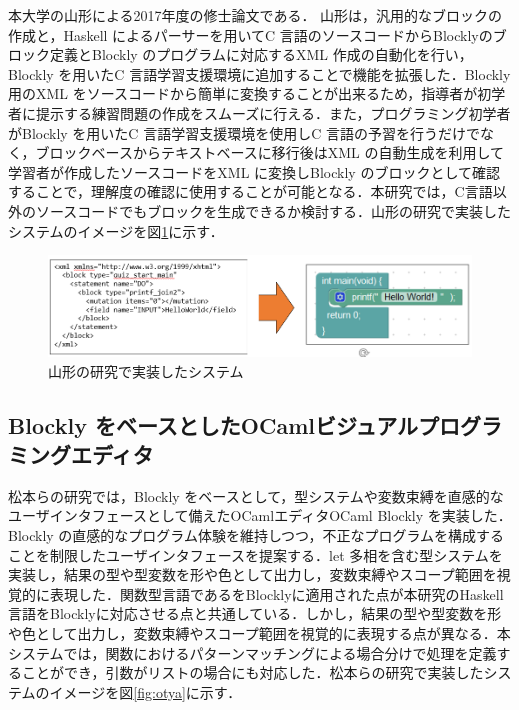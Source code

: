 \documentclass{risepaper}
\begin{document}
  本大学の山形による2017年度の修士論文\cite{yamagata, yamagata2}である．
 山形は，汎用的なブロックの作成と，Haskell によるパーサーを用いてC 言語のソースコードからBlocklyのブロック定義とBlockly のプログラムに対応するXML 作成の自動化を行い，Blockly を用いたC 言語学習支援環境に追加することで機能を拡張した．Blockly 用のXML をソースコードから簡単に変換することが出来るため，指導者が初学者に提示する練習問題の作成をスムーズに行える．また，プログラミング初学者がBlockly を用いたC 言語学習支援環境を使用しC 言語の予習を行うだけでなく，ブロックベースからテキストベースに移行後はXML の自動生成を利用して学習者が作成したソースコードをXML に変換しBlockly のブロックとして確認することで，理解度の確認に使用することが可能となる．本研究では，C言語以外のソースコードでもブロックを生成できるか検討する．山形の研究で実装したシステムのイメージを図\ref{fig:yamagata}に示す． 
 
\begin{figure}[h]
\begin{center}
\includegraphics[scale=0.8]{img/yamagata.PNG}
\caption{山形の研究で実装したシステム}%
\label{fig:yamagata}
\end{center}%
\end{figure}%

	\subsection{Blockly をベースとしたOCamlビジュアルプログラミングエディタ}
    
松本らの研究\cite{otya}では，Blockly をベースとして，型システムや変数束縛を直感的なユーザインタフェースとして備えたOCamlエディタOCaml Blockly を実装した．Blockly の直感的なプログラム体験を維持しつつ，不正なプログラムを構成することを制限したユーザインタフェースを提案する．let 多相を含む型システムを実装し，結果の型や型変数を形や色として出力し，変数束縛やスコープ範囲を視覚的に表現した．関数型言語であるをBlocklyに適用された点が本研究のHaskell言語をBlocklyに対応させる点と共通している．しかし，結果の型や型変数を形や色として出力し，変数束縛やスコープ範囲を視覚的に表現する点が異なる．本システムでは，関数におけるパターンマッチングによる場合分けで処理を定義することができ，引数がリストの場合にも対応した．松本らの研究で実装したシステムのイメージを図\ref{fig:otya}に示す． 
\end{document}
